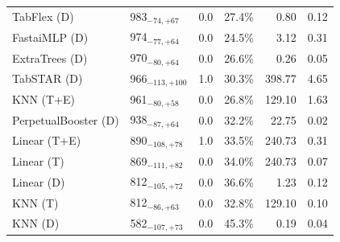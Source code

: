 \begin{tabular}{llccrr}
TabFlex (D) & 983${}_{-74,+67}$ & 0.0 & 27.4\% & 0.80 & 0.12 \\
FastaiMLP (D) & 974${}_{-77,+64}$ & 0.0 & 24.5\% & 3.12 & 0.31 \\
ExtraTrees (D) & 970${}_{-80,+64}$ & 0.0 & 26.6\% & 0.26 & 0.05 \\
TabSTAR (D) & 966${}_{-113,+100}$ & 1.0 & 30.3\% & 398.77 & 4.65 \\
KNN (T+E) & 961${}_{-80,+58}$ & 0.0 & 26.8\% & 129.10 & 1.63 \\
PerpetualBooster (D) & 938${}_{-87,+64}$ & 0.0 & 32.2\% & 22.75 & 0.02 \\
Linear (T+E) & 890${}_{-108,+78}$ & 1.0 & 33.5\% & 240.73 & 0.31 \\
Linear (T) & 869${}_{-111,+82}$ & 0.0 & 34.0\% & 240.73 & 0.07 \\
Linear (D) & 812${}_{-105,+72}$ & 0.0 & 36.6\% & 1.23 & 0.12 \\
KNN (T) & 812${}_{-86,+63}$ & 0.0 & 32.8\% & 129.10 & 0.10 \\
KNN (D) & 582${}_{-107,+73}$ & 0.0 & 45.3\% & 0.19 & 0.04 \\
\bottomrule
\end{tabular}